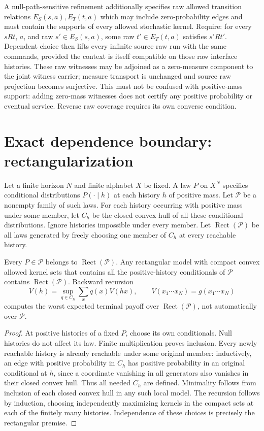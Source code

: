 \documentclass[11pt]{article}
\begin{document}
A null-path-sensitive refinement additionally specifies raw allowed transition relations $E_S(s,a),E_T(t,a)$ which may include zero-probability edges and must contain the supports of every allowed stochastic kernel. Require: for every $sRt$, $a$, and raw $s'\in E_S(s,a)$, some raw $t'\in E_T(t,a)$ satisfies $s'Rt'$. Dependent choice then lifts every infinite source raw run with the same commands, provided the context is itself compatible on those raw interface histories. These raw witnesses may be adjoined as a zero-measure component to the joint witness carrier; measure transport is unchanged and source raw projection becomes surjective. This must not be confused with positive-mass support: adding zero-mass witnesses does not certify any positive probability or eventual service. Reverse raw coverage requires its own converse condition.

\section{Exact dependence boundary: rectangularization}
Let a finite horizon $N$ and finite alphabet $X$ be fixed. A law $P$ on $X^N$ specifies conditional distributions $P(\cdot\mid h)$ at each history $h$ of positive mass. Let $\mathcal P$ be a nonempty family of such laws. For each history occurring with positive mass under some member, let $C_h$ be the closed convex hull of all these conditional distributions. Ignore histories impossible under every member. Let $\operatorname{Rect}(\mathcal P)$ be all laws generated by freely choosing one member of $C_h$ at every reachable history.

\begin{proposition}
Every $P\in\mathcal P$ belongs to $\operatorname{Rect}(\mathcal P)$. Any rectangular model with compact convex allowed kernel sets that contains all the positive-history conditionals of $\mathcal P$ contains $\operatorname{Rect}(\mathcal P)$. Backward recursion
\[
 V(h)=\sup_{q\in C_h}\sum_xq(x)V(hx),\qquad V(x_1\cdots x_N)=g(x_1\cdots x_N)
\]
computes the worst expected terminal payoff over $\operatorname{Rect}(\mathcal P)$, not automatically over $\mathcal P$.
\end{proposition}
\begin{proof}
At positive histories of a fixed $P$, choose its own conditionals. Null histories do not affect its law. Finite multiplication proves inclusion. Every newly reachable history is already reachable under some original member: inductively, an edge with positive probability in $C_h$ has positive probability in an original conditional at $h$, since a coordinate vanishing in all generators also vanishes in their closed convex hull. Thus all needed $C_h$ are defined. Minimality follows from inclusion of each closed convex hull in any such local model. The recursion follows by induction, choosing independently maximizing kernels in the compact sets at each of the finitely many histories. Independence of these choices is precisely the rectangular premise.
\end{proof}
\end{document}
